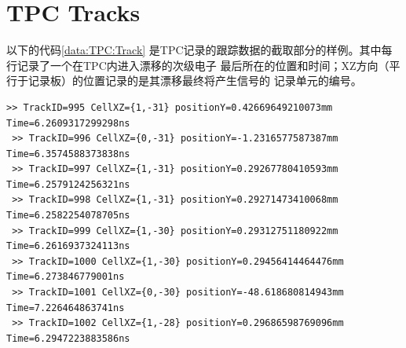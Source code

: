 \documentclass[bachelor,openany,oneside,color]{buaathesis}
\begin{document}
\section{TPC Tracks}\label{sec:data:TPC:Track}

以下的代码\ref{data:TPC:Track}
是TPC记录的跟踪数据的截取部分的样例。其中每行记录了一个在TPC内进入漂移的次级电子
最后所在的位置和时间；XZ方向（平行于记录板）的位置记录的是其漂移最终将产生信号的
记录单元的编号。
\begin{lstlisting}[caption={TPC Tracks},label={data:TPC:Track},firstnumber=2650,lastline=2657]
 >> TrackID=995 CellXZ={1,-31} positionY=0.42669649210073mm Time=6.2609317299298ns
 >> TrackID=996 CellXZ={0,-31} positionY=-1.2316577587387mm Time=6.3574588373838ns
 >> TrackID=997 CellXZ={1,-31} positionY=0.29267780410593mm Time=6.2579124256321ns
 >> TrackID=998 CellXZ={1,-31} positionY=0.29271473410068mm Time=6.2582254078705ns
 >> TrackID=999 CellXZ={1,-30} positionY=0.29312751180922mm Time=6.2616937324113ns
 >> TrackID=1000 CellXZ={1,-30} positionY=0.29456414464476mm Time=6.273846779001ns
 >> TrackID=1001 CellXZ={0,-30} positionY=-48.618680814943mm Time=7.226464863741ns
 >> TrackID=1002 CellXZ={1,-28} positionY=0.29686598769096mm Time=6.2947223883586ns
\end{lstlisting}
\end{document}
